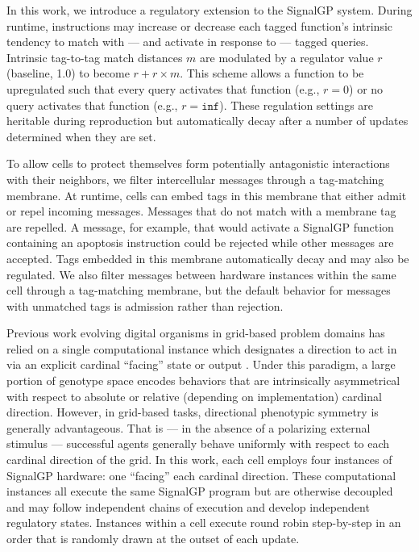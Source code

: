 In this work, we introduce a regulatory extension to the SignalGP system.
During runtime, instructions may increase or decrease each tagged function's intrinsic tendency to match with --- and activate in response to --- tagged queries.
Intrinsic tag-to-tag match distances $m$ are modulated by a regulator value $r$ (baseline, 1.0) to become $r + r \times m$.
This scheme allows a function to be upregulated such that every query activates that function (e.g., $r = 0$) or no query activates that function (e.g., $r = \texttt{inf}$).
These regulation settings are heritable during reproduction but automatically decay after a number of updates determined when they are set.

To allow cells to protect themselves form potentially antagonistic interactions with their neighbors, we filter intercellular messages through a tag-matching membrane.
At runtime, cells can embed tags in this membrane that either admit or repel incoming messages.
Messages that do not match with a membrane tag are repelled.
A message, for example, that would activate a SignalGP function containing an apoptosis instruction could be rejected while other messages are accepted.
Tags embedded in this membrane automatically decay and may also be regulated.
We also filter messages between hardware instances within the same cell through a tag-matching membrane, but the default behavior for messages with unmatched tags is admission rather than rejection.

Previous work evolving digital organisms in grid-based problem domains has relied on a single computational instance which designates a direction to act in via an explicit cardinal ``facing'' state or output \cite{goldsby2014evolutionary, goldsby2018serendipitous, grabowski2010early, biswas2014causes, lalejini2018evolving}.
Under this paradigm, a large portion of genotype space encodes behaviors that are intrinsically asymmetrical with respect to absolute or relative (depending on implementation) cardinal direction.
However, in grid-based tasks, directional phenotypic symmetry is generally advantageous.
That is --- in the absence of a polarizing external stimulus --- successful agents generally behave uniformly with respect to each cardinal direction of the grid.
In this work, each cell employs four instances of SignalGP hardware: one ``facing'' each cardinal direction.
These computational instances all execute the same SignalGP program but are otherwise decoupled and may follow independent chains of execution and develop independent regulatory states.
Instances within a cell execute round robin step-by-step in an order that is randomly drawn at the outset of each update.

